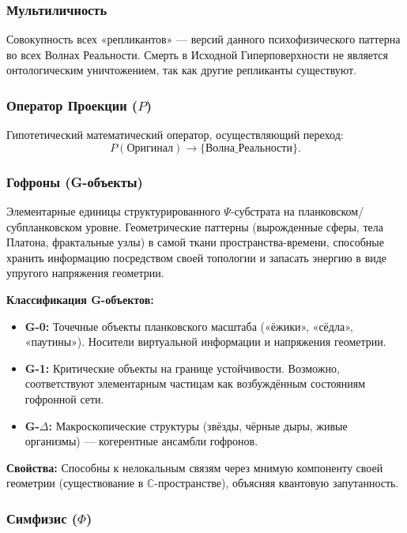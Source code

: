 \documentclass[a4paper,12pt]{article}
\begin{document}
\subsubsection{Мультиличность}

Совокупность всех «репликантов» — версий данного психофизического паттерна во всех Волнах Реальности. Смерть в Исходной Гиперповерхности не является онтологическим уничтожением, так как другие репликанты существуют.

\subsubsection{Оператор Проекции ($P$)}

Гипотетический математический оператор, осуществляющий переход:
\[
P(\text{Оригинал}) \to \{\text{Волна\_Реальности}\}.
\]

\subsubsection{Гофроны (G-объекты)}

Элементарные единицы структурированного $\Psi$-субстрата на планковском/субпланковском уровне. Геометрические паттерны (вырожденные сферы, тела Платона, фрактальные узлы) в самой ткани пространства-времени, способные хранить информацию посредством своей топологии и запасать энергию в виде упругого напряжения геометрии.

\textbf{Классификация G-объектов:}
\begin{itemize}
	\item \textbf{G-0:} Точечные объекты планковского масштаба («ёжики», «сёдла», «паутины»). Носители виртуальной информации и напряжения геометрии.
	\item \textbf{G-1:} Критические объекты на границе устойчивости. Возможно, соответствуют элементарным частицам как возбуждённым состояниям гофронной сети.
	\item \textbf{G-$\Delta$:} Макроскопические структуры (звёзды, чёрные дыры, живые организмы) — когерентные ансамбли гофронов.
\end{itemize}

\textbf{Свойства:} Способны к нелокальным связям через мнимую компоненту своей геометрии (существование в $\mathbb{C}$-пространстве), объясняя квантовую запутанность.

\subsubsection{Симфизис ($\Phi$)}
\end{document}
